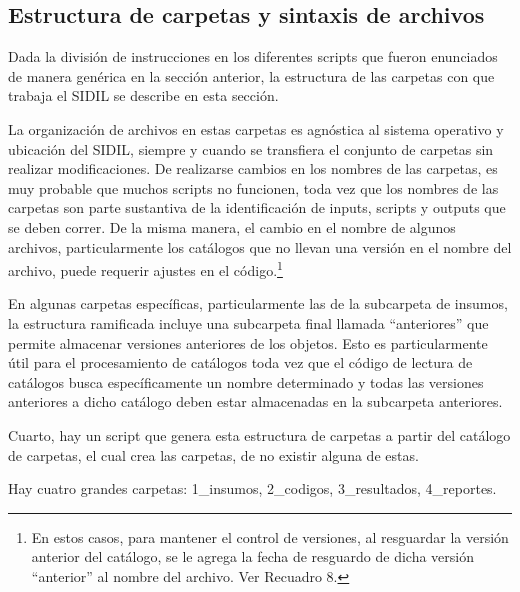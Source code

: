 \documentclass[
]{article}
\begin{document}
\hypertarget{estructuracarpetas}{%
\subsection{Estructura de carpetas y sintaxis de archivos}\label{estructuracarpetas}}

Dada la división de instrucciones en los diferentes scripts que fueron enunciados de manera genérica en la sección anterior, la estructura de las carpetas con que trabaja el SIDIL se describe en esta sección.

La organización de archivos en estas carpetas es agnóstica al sistema operativo y ubicación del SIDIL, siempre y cuando se transfiera el conjunto de carpetas sin realizar modificaciones. De realizarse cambios en los nombres de las carpetas, es muy probable que muchos scripts no funcionen, toda vez que los nombres de las carpetas son parte sustantiva de la identificación de inputs, scripts y outputs que se deben correr. De la misma manera, el cambio en el nombre de algunos archivos, particularmente los catálogos que no llevan una versión en el nombre del archivo, puede requerir ajustes en el código.\footnote{En estos casos, para mantener el control de versiones, al resguardar la versión anterior del catálogo, se le agrega la fecha de resguardo de dicha versión ``anterior'' al nombre del archivo. Ver Recuadro 8.}

En algunas carpetas específicas, particularmente las de la subcarpeta de insumos, la estructura ramificada incluye una subcarpeta final llamada ``anteriores'' que permite almacenar versiones anteriores de los objetos. Esto es particularmente útil para el procesamiento de catálogos toda vez que el código de lectura de catálogos busca específicamente un nombre determinado y todas las versiones anteriores a dicho catálogo deben estar almacenadas en la subcarpeta anteriores.

Cuarto, hay un script que genera esta estructura de carpetas a partir del catálogo de carpetas, el cual crea las carpetas, de no existir alguna de estas.

Hay cuatro grandes carpetas: 1\_insumos, 2\_codigos, 3\_resultados, 4\_reportes.
\end{document}
